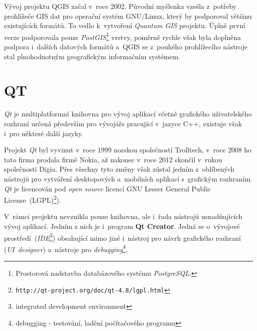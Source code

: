 Vývoj projektu QGIS začal v~roce 2002. Původní myšlenka vzešla z~potřeby 
prohlížeče GIS dat pro operační systém GNU/Linux, který by podporoval většinu 
existujících formátů. To vedlo k~vytvoření \textit{Quantum GIS} projektu. Úplně 
první verze podporovala pouze \textit{PostGIS}\footnote{Prostorová nadstavba 
databázového systému \textit{PostgreSQL}.} vrstvy, poměrně rychle však byla 
doplněna podpora i~dalších datových formátů a~QGIS se z~pouhého prohlížecího 
nástroje stal plnohodnotným geografickým informačním systémem.




\section{QT}
\label{qt}

\textit{Qt} je multiplatformní knihovna pro vývoj aplikací včetně grafického 
uživatelského rozhraní určená především pro vývojáře pracující v~jazyce C++,
existuje však i~pro některé další jazyky.

Projekt \textit{Qt} byl vyvinut v~roce 1999 norskou společností Trolltech, 
v~roce 2008 ho tato firma prodala firmě Nokia, až nakonec v~roce 2012 skončil 
v~rukou společnosti Digia. Přes všechny tyto změny však zůstal jedním z~oblíbených
nástrojů pro vytváření desktopových a~mobilních aplikací s~grafickým rozhraním.
\textit{Qt} je licencován pod \textit{open source} licencí GNU Lesser General 
Public License~(LGPL)\footnote{\texttt{http://qt-project.org/doc/qt-4.8/lgpl.html}}).

V~rámci projektu nevznikla pouze knihovna, ale i~řada nástrojů usnadňujících
vývoj aplikací. Jedním z nich je i~program \textbf{Qt Creator}. Jedná se o~vývojové 
prostředí~(\textit{IDE}\footnote{integrated development environment}) obsahující 
mimo jiné i~nástroj pro návrh grafického rozhraní (\textit{UI~designer}) a~nástroje 
pro \textit{debugging}\footnote{debugging - testování, ladění počítačového programu}.
